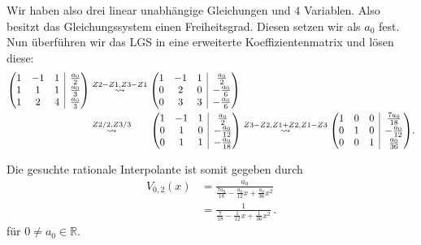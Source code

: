 \documentclass[10pt]{article}
\makeatletter
\newcommand{\R}{\mathbb{R}}
\newenvironment{amatrix}[1]{%
  \left(\begin{array}{@{}*{#1}{c}|c@{}}
}{%
  \end{array}\right)
}
\makeatother
\begin{document}
    Wir haben also drei linear unabhängige Gleichungen und $4$ Variablen. Also besitzt das Gleichungssystem einen 
    Freiheitsgrad. Diesen setzen wir als $a_0$ fest. Nun überführen wir das LGS in eine erweiterte Koeffizientenmatrix und
    lösen diese:
    \begin{align*}
        \begin{amatrix}{3}
            1 & -1 & 1 & \frac{a_0}{2} \\
            1 & 1  & 1 & \frac{a_0}{3} \\
            1 & 2  & 4 & \frac{a_0}{3}
        \end{amatrix}
        &\stackrel{Z2-Z1, Z3-Z1}{\rightsquigarrow}  
        \begin{amatrix}{3}
            1 & -1 &  1 & \frac{a_0}{2}  \\
            0 &  2 &  0 & -\frac{a_0}{6} \\
            0 &  3 &  3 & -\frac{a_0}{6}
        \end{amatrix} \\
        &\stackrel{Z2/2, Z3/3}{\rightsquigarrow} \hspace*{0.6cm}
        \begin{amatrix}{3}
            1 & -1 &  1 & \frac{a_0}{2}   \\
            0 &  1 &  0 & -\frac{a_0}{12} \\
            0 &  1 &  1 & -\frac{a_0}{18} 
        \end{amatrix} 
        \stackrel{Z3-Z2, Z1+Z2, Z1-Z3}{\rightsquigarrow}
        \begin{amatrix}{3}
            1 &  0 &  0 & \frac{7a_0}{18} \\
            0 &  1 &  0 & -\frac{a_0}{12} \\
            0 &  0 &  1 & \frac{a_0}{36} 
        \end{amatrix}.
    \end{align*}     

    Die gesuchte rationale Interpolante ist somit gegeben durch
    \begin{align*}
        V_{0,2}(x) &= \frac{a_0}{\frac{7a_0}{18} -\frac{a_0}{12}x + \frac{a_0}{36}x^2} \\
                   &= \frac{1}{\frac{7}{18} -\frac{1}{12}x + \frac{1}{36}x^2}\,.
    \end{align*}
    für $0 \neq a_0\in\R$.
\end{document}
